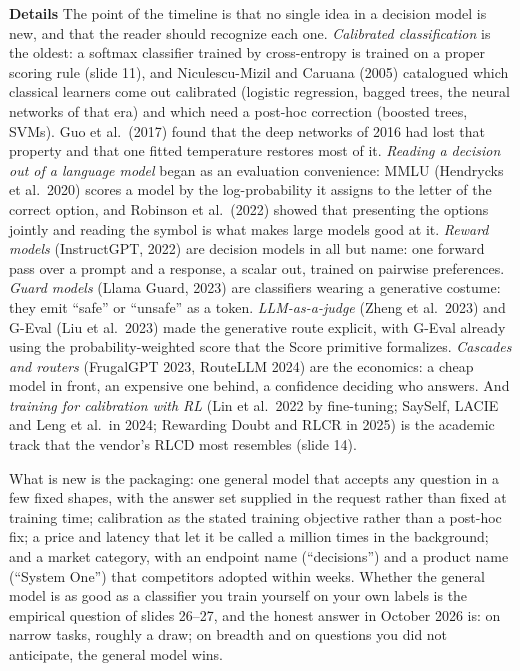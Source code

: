 \documentclass[11pt,letterpaper]{article}
\newcommand{\para}[1]{\medskip\noindent\textbf{#1}\quad}
\begin{document}
\para{Details} The point of the timeline is that no single idea in a decision model is new, and that the reader should recognize each one. \emph{Calibrated classification} is the oldest: a softmax classifier trained by cross-entropy is trained on a proper scoring rule (slide 11), and Niculescu-Mizil and Caruana (2005) catalogued which classical learners come out calibrated (logistic regression, bagged trees, the neural networks of that era) and which need a post-hoc correction (boosted trees, SVMs). Guo et al.\ (2017) found that the deep networks of 2016 had lost that property and that one fitted temperature restores most of it. \emph{Reading a decision out of a language model} began as an evaluation convenience: MMLU (Hendrycks et al.\ 2020) scores a model by the log-probability it assigns to the letter of the correct option, and Robinson et al.\ (2022) showed that presenting the options jointly and reading the symbol is what makes large models good at it. \emph{Reward models} (InstructGPT, 2022) are decision models in all but name: one forward pass over a prompt and a response, a scalar out, trained on pairwise preferences. \emph{Guard models} (Llama Guard, 2023) are classifiers wearing a generative costume: they emit ``safe'' or ``unsafe'' as a token. \emph{LLM-as-a-judge} (Zheng et al.\ 2023) and G-Eval (Liu et al.\ 2023) made the generative route explicit, with G-Eval already using the probability-weighted score that the Score primitive formalizes. \emph{Cascades and routers} (FrugalGPT 2023, RouteLLM 2024) are the economics: a cheap model in front, an expensive one behind, a confidence deciding who answers. And \emph{training for calibration with RL} (Lin et al.\ 2022 by fine-tuning; SaySelf, LACIE and Leng et al.\ in 2024; Rewarding Doubt and RLCR in 2025) is the academic track that the vendor's RLCD most resembles (slide 14).

What is new is the packaging: one general model that accepts any question in a few fixed shapes, with the answer set supplied in the request rather than fixed at training time; calibration as the stated training objective rather than a post-hoc fix; a price and latency that let it be called a million times in the background; and a market category, with an endpoint name (``decisions'') and a product name (``System One'') that competitors adopted within weeks. Whether the general model is as good as a classifier you train yourself on your own labels is the empirical question of slides 26--27, and the honest answer in October 2026 is: on narrow tasks, roughly a draw; on breadth and on questions you did not anticipate, the general model wins.
\end{document}
